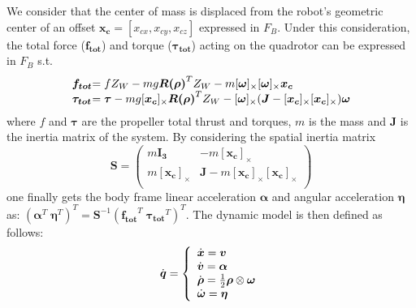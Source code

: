 We consider that the center of mass is displaced from the robot's geometric center of an offset $\boldsymbol{x_{c}} = [x_{cx}, x_{cy}, x_{cz}]$ expressed in $F_B$. 
Under this consideration, the total force ($\boldsymbol{f_{tot}}$) and torque ($\boldsymbol{\tau_{tot}}$) acting on the quadrotor can be expressed in $F_B$ s.t. 
\[
    \begin{array}{@{}l@{}l@{}}
        \boldsymbol{f_{tot}} &= f Z_W - mg\boldsymbol{R(\rho)}^TZ_W-m[\boldsymbol{\omega}]_{\times}[\boldsymbol{\omega}]_{\times}\boldsymbol{x_c} 
          
          \\
      
       \boldsymbol{\tau_{tot}} &= \boldsymbol{\tau}-mg[\boldsymbol{x_c}]_{\times}\boldsymbol{R(\rho)}^{T}Z_W - [\boldsymbol{\omega}]_{\times}(\boldsymbol{J}-[\boldsymbol{x_c}]_{\times}[\boldsymbol{x_c}]_{\times})\boldsymbol{\omega}
  \end{array}
\]
where $f$ and $\boldsymbol{\tau}$ are the propeller total thrust and torques, $m$ is the mass and $\boldsymbol{J}$ is the inertia matrix of the system. 
By considering the spatial inertia matrix
\[
\boldsymbol{S} =   \left( {\begin{array}{cc}
    m\boldsymbol{I_3} & -m[\boldsymbol{x_c}]_{\times} \\
    m[\boldsymbol{x_c}]_{\times} & \boldsymbol{J}-m[\boldsymbol{x_c}]_{\times}[\boldsymbol{x_c}]_{\times} \\
  \end{array} } \right)
\]
one finally gets the body frame linear acceleration $\boldsymbol{\alpha}$ and angular acceleration $\boldsymbol{\eta}$
as: 
$
\left( 
    \boldsymbol{\alpha}^T \; \boldsymbol{\eta}^T \right)^T 
  =
  \boldsymbol{S}^{-1}
  \left( \boldsymbol{f_{tot}}^T \;
    \boldsymbol{\tau_{tot}}^T \right)^T. 
$
The dynamic model is then defined as follows:
\begin{equation}\label{eq:dynamic}
    \Dot{\boldsymbol{q}}
    =
     \left \{
     \begin{array}{l l}
           \dot{\boldsymbol{x}} = \boldsymbol{v} \\
           
           \dot{\boldsymbol{v}}= \boldsymbol{\alpha} \\

           \dot{\boldsymbol{\rho}}=\frac{1}{2}
               \boldsymbol{\rho} \otimes \boldsymbol{\omega} \\
           
           \dot{\boldsymbol{\omega}}=\boldsymbol{\eta}
   \end{array}
   \right .
\end{equation}

